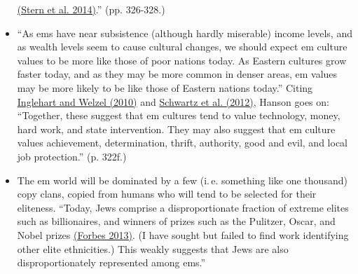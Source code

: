 \documentclass[]{article}
\begin{document}
\begin{itemize}
  \href{http://citeseerx.ist.psu.edu/viewdoc/download?doi=10.1.1.825.5270\&rep=rep1\&type=pdf}{(Stern
  et al. 2014)}.'' (pp. 326-328.)
\item
  ``As ems have near subsistence (although hardly miserable) income
  levels, and as wealth levels seem to cause cultural changes, we should
  expect em culture values to be more like those of poor nations today.
  As Eastern cultures grow faster today, and as they may be more common
  in denser areas, em values may be more likely to be like those of
  Eastern nations today.'' Citing
  \href{http://indicatorsinfo.pbworks.com/f/Inglehart+Mass+Priorities+and+Democracy.pdf}{Inglehart
  and Welzel (2010)} and
  \href{http://citeseerx.ist.psu.edu/viewdoc/download?doi=10.1.1.832.177\&rep=rep1\&type=pdf}{Schwartz
  et al. (2012)}, Hanson goes on: ``Together, these suggest that em
  cultures tend to value technology, money, hard work, and state
  intervention. They may also suggest that em culture values
  achievement, determination, thrift, authority, good and evil, and
  local job protection.'' (p. 322f.)
\item
  The em world will be dominated by a few (i.\,e. something like one
  thousand) copy clans, copied from humans who will tend to be selected
  for their eliteness. ``Today, Jews comprise a disproportionate
  fraction of extreme elites such as billionaires, and winners of prizes
  such as the Pulitzer, Oscar, and Nobel prizes
  \href{http://www.forbes.co.il/news/new.aspx?pn6Vq=J\&0r9VQ=IEII}{(Forbes
  2013)}. (I have sought but failed to find work identifying other
  elite ethnicities.) This weakly suggests that Jews are also
  disproportionately represented among ems.''
\end{itemize}

\begin{sloppypar} %
\printbibliography
\end{sloppypar}
\end{document}
